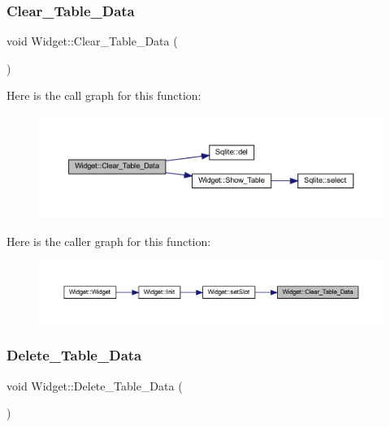 \subsubsection{\texorpdfstring{Clear\_Table\_Data}{Clear\_Table\_Data}}
{\footnotesize\ttfamily void Widget\+::\+Clear\+\_\+\+Table\+\_\+\+Data (\begin{DoxyParamCaption}{ }\end{DoxyParamCaption})\hspace{0.3cm}{\ttfamily [slot]}}

Here is the call graph for this function\+:
\nopagebreak
\begin{figure}[H]
\begin{center}
\leavevmode
\includegraphics[width=350pt]{class_widget_a6fc213aa66cf58f876e117af46f6aa0a_cgraph}
\end{center}
\end{figure}
Here is the caller graph for this function\+:
\nopagebreak
\begin{figure}[H]
\begin{center}
\leavevmode
\includegraphics[width=350pt]{class_widget_a6fc213aa66cf58f876e117af46f6aa0a_icgraph}
\end{center}
\end{figure}
\mbox{\label{class_widget_a0e7b4792c1f760b129a08ac63107a018}} 
\subsubsection{\texorpdfstring{Delete\_Table\_Data}{Delete\_Table\_Data}}
{\footnotesize\ttfamily void Widget\+::\+Delete\+\_\+\+Table\+\_\+\+Data (\begin{DoxyParamCaption}{ }\end{DoxyParamCaption})\hspace{0.3cm}{\ttfamily [slot]}}

